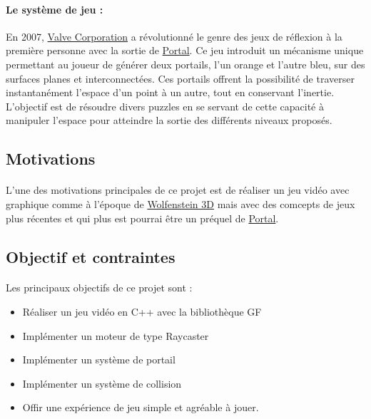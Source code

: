 \documentclass[12pt]{report}
\begin{document}
\paragraph{Le système de jeu : }
En 2007, \href{https://fr.wikipedia.org/wiki/Valve_Corporation}{Valve Corporation} a révolutionné le genre des jeux 
de réflexion à la première personne avec la sortie de 
\href{https://fr.wikipedia.org/wiki/Portal_(jeu_vid%C3%A9o)}{Portal}. Ce jeu introduit un mécanisme unique 
permettant au joueur de générer deux portails, l'un orange et l'autre bleu, sur des surfaces planes et 
interconnectées. Ces portails offrent la possibilité de traverser instantanément l'espace d'un point à un autre, 
tout en conservant l'inertie. L'objectif est de résoudre divers puzzles en se servant de cette capacité à manipuler 
l'espace pour atteindre la sortie des différents niveaux proposés.
\clearpage

\subsection{Motivations}

\paragraph{}

L'une des motivations principales de ce projet est de réaliser un jeu vidéo
avec graphique comme à l'époque de \href{https://fr.wikipedia.org/wiki/Wolfenstein_3D}{Wolfenstein 3D} 
mais avec des comcepts de jeux plus récentes et qui plus est pourrai être
un préquel de \href{https://fr.wikipedia.org/wiki/Portal_(jeu_vid%C3%A9o)}{Portal}.


\subsection{Objectif et contraintes}

\paragraph{}
Les principaux objectifs de ce projet sont :
\begin{itemize}
	\item Réaliser un jeu vidéo en C++ avec la bibliothèque GF
	\item Implémenter un moteur de type Raycaster
	\item Implémenter un système de portail
	\item Implémenter un système de collision
	\item Offir une expérience de jeu simple et agréable à jouer.
\end{itemize}
\end{document}
